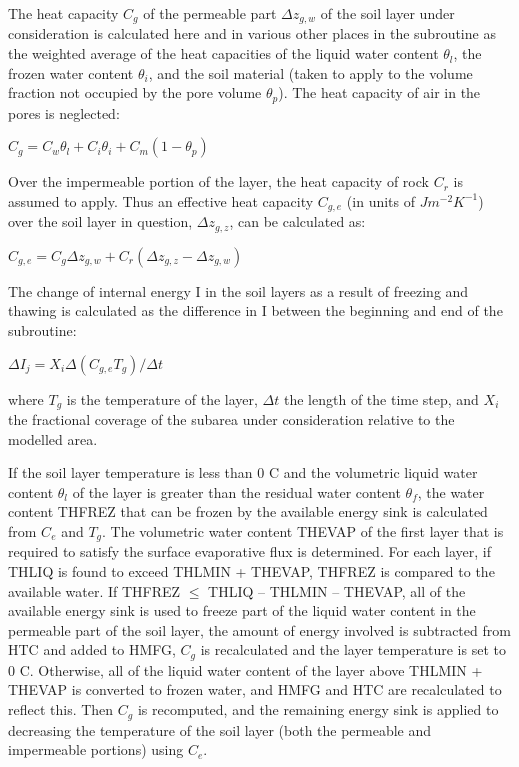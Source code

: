 The heat capacity $C_g$ of the permeable part $\Delta z_{g,w}$ of the soil layer under consideration is calculated here and in various other places in the subroutine as the weighted average of the heat capacities of the liquid water content $\theta_l$, the frozen water content $\theta_i$, and the soil material (taken to apply to the volume fraction not occupied by the pore volume $\theta_p$). The heat capacity of air in the pores is neglected\+:

$C_g = C_w \theta_l + C_i \theta_i + C_m (1 - \theta_p)$

Over the impermeable portion of the layer, the heat capacity of rock $C_r$ is assumed to apply. Thus an effective heat capacity $C_{g,e}$ (in units of $J m^{-2} K^{-1}$) over the soil layer in question, $\Delta z_{g,z}$, can be calculated as\+:

$C_{g,e} = C_g \Delta z_{g,w} + C_r(\Delta z_{g,z} - \Delta z_{g,w})$

The change of internal energy I in the soil layers as a result of freezing and thawing is calculated as the difference in I between the beginning and end of the subroutine\+:

$\Delta I_j = X_i \Delta (C_{g,e} T_g)/\Delta t$

where $T_g$ is the temperature of the layer, $\Delta t$ the length of the time step, and $X_i$ the fractional coverage of the subarea under consideration relative to the modelled area.

If the soil layer temperature is less than 0 C and the volumetric liquid water content $\theta_l$ of the layer is greater than the residual water content $\theta_f$, the water content T\+H\+F\+R\+E\+Z that can be frozen by the available energy sink is calculated from $C_e$ and $T_g$. The volumetric water content T\+H\+E\+V\+A\+P of the first layer that is required to satisfy the surface evaporative flux is determined. For each layer, if T\+H\+L\+I\+Q is found to exceed T\+H\+L\+M\+I\+N + T\+H\+E\+V\+A\+P, T\+H\+F\+R\+E\+Z is compared to the available water. If T\+H\+F\+R\+E\+Z $\leq$ T\+H\+L\+I\+Q – T\+H\+L\+M\+I\+N – T\+H\+E\+V\+A\+P, all of the available energy sink is used to freeze part of the liquid water content in the permeable part of the soil layer, the amount of energy involved is subtracted from H\+T\+C and added to H\+M\+F\+G, $C_g$ is recalculated and the layer temperature is set to 0 C. Otherwise, all of the liquid water content of the layer above T\+H\+L\+M\+I\+N + T\+H\+E\+V\+A\+P is converted to frozen water, and H\+M\+F\+G and H\+T\+C are recalculated to reflect this. Then $C_g$ is recomputed, and the remaining energy sink is applied to decreasing the temperature of the soil layer (both the permeable and impermeable portions) using $C_e$.

